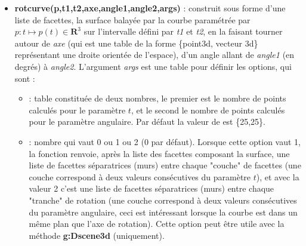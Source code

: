 \documentclass[%
10pt,%
a4paper,%
french,%
]%
{article}%
\newenvironment*{demo}[2][]{%
\gdef\legende{#2}%
\gdef\lab{#1}%
\bgroup
\VerbatimOut{\jobname.tmp}%
}%
{%
\endVerbatimOut%
\egroup%
\inputminted[ignorelexererrors=true,breaklines,bgcolor=Beige,linenos,numbersep=6pt,frame=single,fontsize=\footnotesize]{Lua}{\jobname.tmp}%
\begin{minipage}{0.9\textwidth}
\begin{center}
\captionof{figure}{\legende}\label{\lab}%
%
\end{center}
\end{minipage}
}
\begin{document}
\begin{itemize}
\begin{demo}{Exemple avec line2tube}
\begin{luadraw}{name=line2tube}
local cos, sin, pi, i = math.cos, math.sin, math.pi, cpx.I
local g = graph3d:new{window={-5,8,-4.5,4.5}, viewdir={45,60}, margin={0,0,0,0}, size={10,10}}
g:Linejoin("round")
local L1 = map(toPoint3d,polyreg(0,3,6)) -- hexagone régulier dans le plan xOy, centre O de sommet M(3,0,0)
local L2 = shift3d(rotate3d(L1,90,{Origin,vecJ}),3*vecJ)
local T1 = line2tube(L1,1,{nbfacet=8,close=true}) -- tube 1 refermé
local T2 = line2tube(L2,1,{nbfacet=8})  -- tube 2 non refermé
g:Dmixfacet( T1, {color="Crimson",opacity=0.8}, T2, {color="SteelBlue"} )
g:Show()
\end{luadraw}
\end{demo}

    \item \textbf{rotcurve(p,t1,t2,axe,angle1,angle2,args)} : construit sous forme d'une liste de facettes, la surface balayée par la courbe paramétrée par $p\colon t\mapsto p(t)\in \mathbf R^3$ sur l'intervalle défini par \emph{t1} et \emph{t2}, en la faisant tourner autour de \emph{axe} (qui est une table de la forme \{point3d, vecteur 3d\} représentant une droite orientée de l'espace), d'un angle allant de \emph{angle1} (en degrés) à \emph{angle2}. L'argument \emph{args} est une table pour définir les options, qui sont :
    \begin{itemize}
        \item {} : table constituée de deux nombres, le premier est le nombre de points calculés pour le paramètre $t$, et le second le nombre de points calculés pour le paramètre angulaire. Par défaut la valeur de  est \{25,25\}.

        \item {} : nombre qui vaut 0 ou 1 ou 2 (0 par défaut). Lorsque cette option vaut 1, la fonction renvoie, après la liste des facettes composant la surface, une liste de facettes séparatrices (murs) entre chaque "couche" de facettes (une couche correspond à deux valeurs consécutives du paramètre $t$), et avec la valeur 2 c'est une liste de facettes séparatrices (murs) entre chaque "tranche" de rotation (une couche correspond à deux valeurs consécutives du paramètre angulaire, ceci est intéressant lorsque la courbe est dans un même plan que l'axe de rotation). Cette option peut être utile avec la méthode \textbf{g:Dscene3d} (uniquement).
        \end{itemize} 
        

\end{itemize}
\end{document}
